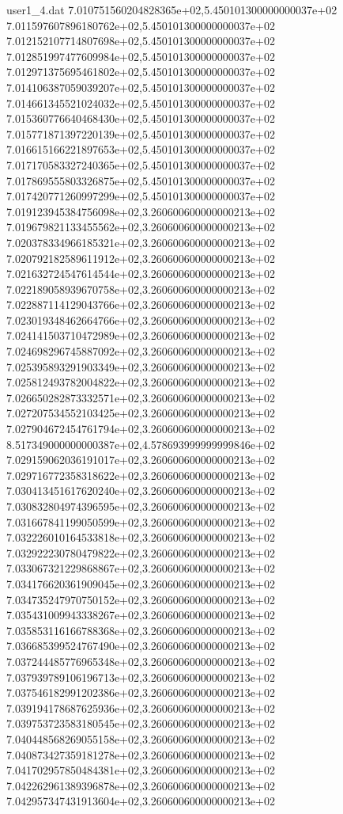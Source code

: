 \begin{filecontents}{user1_4.dat}
7.010751560204828365e+02,5.450101300000000037e+02
7.011597607896180762e+02,5.450101300000000037e+02
7.012152107714807698e+02,5.450101300000000037e+02
7.012851997477609984e+02,5.450101300000000037e+02
7.012971375695461802e+02,5.450101300000000037e+02
7.014106387059039207e+02,5.450101300000000037e+02
7.014661345521024032e+02,5.450101300000000037e+02
7.015360776640468430e+02,5.450101300000000037e+02
7.015771871397220139e+02,5.450101300000000037e+02
7.016615166221897653e+02,5.450101300000000037e+02
7.017170583327240365e+02,5.450101300000000037e+02
7.017869555803326875e+02,5.450101300000000037e+02
7.017420771260997299e+02,5.450101300000000037e+02
7.019123945384756098e+02,3.260600600000000213e+02
7.019679821133455562e+02,3.260600600000000213e+02
7.020378334966185321e+02,3.260600600000000213e+02
7.020792182589611912e+02,3.260600600000000213e+02
7.021632724547614544e+02,3.260600600000000213e+02
7.022189058939670758e+02,3.260600600000000213e+02
7.022887114129043766e+02,3.260600600000000213e+02
7.023019348462664766e+02,3.260600600000000213e+02
7.024141503710472989e+02,3.260600600000000213e+02
7.024698296745887092e+02,3.260600600000000213e+02
7.025395893291903349e+02,3.260600600000000213e+02
7.025812493782004822e+02,3.260600600000000213e+02
7.026650282873332571e+02,3.260600600000000213e+02
7.027207534552103425e+02,3.260600600000000213e+02
7.027904672454761794e+02,3.260600600000000213e+02
8.517349000000000387e+02,4.578693999999999846e+02
7.029159062036191017e+02,3.260600600000000213e+02
7.029716772358318622e+02,3.260600600000000213e+02
7.030413451617620240e+02,3.260600600000000213e+02
7.030832804974396595e+02,3.260600600000000213e+02
7.031667841199050599e+02,3.260600600000000213e+02
7.032226010164533818e+02,3.260600600000000213e+02
7.032922230780479822e+02,3.260600600000000213e+02
7.033067321229868867e+02,3.260600600000000213e+02
7.034176620361909045e+02,3.260600600000000213e+02
7.034735247970750152e+02,3.260600600000000213e+02
7.035431009943338267e+02,3.260600600000000213e+02
7.035853116166788368e+02,3.260600600000000213e+02
7.036685399524767490e+02,3.260600600000000213e+02
7.037244485776965348e+02,3.260600600000000213e+02
7.037939789106196713e+02,3.260600600000000213e+02
7.037546182991202386e+02,3.260600600000000213e+02
7.039194178687625936e+02,3.260600600000000213e+02
7.039753723583180545e+02,3.260600600000000213e+02
7.040448568269055158e+02,3.260600600000000213e+02
7.040873427359181278e+02,3.260600600000000213e+02
7.041702957850484381e+02,3.260600600000000213e+02
7.042262961389396878e+02,3.260600600000000213e+02
7.042957347431913604e+02,3.260600600000000213e+02

\end{filecontents}
